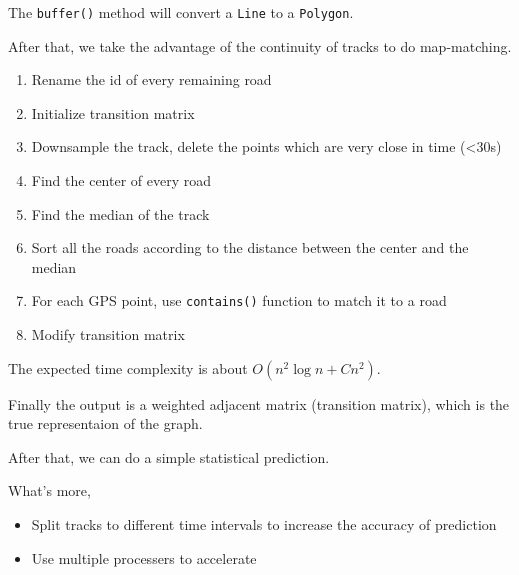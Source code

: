 \documentclass[fontset=none]{ctexart}
\theoremstyle{definition}
\theoremstyle{remark}
\begin{document}
The \texttt{buffer()} method will convert a \texttt{Line} to a \texttt{Polygon}.

After that, we take the advantage of the continuity of tracks to do map-matching.
\begin{enumerate}
  \item Rename the id of every remaining road
  \item Initialize transition matrix
  \item Downsample the track, delete the points which are very close in time (<30s)
  \item Find the center of every road
  \item Find the median of the track
  \item Sort all the roads according to the distance between the center and the median
  \item For each GPS point, use \texttt{contains()} function to match it to a road
  \item Modify transition matrix
\end{enumerate}

The expected time complexity is about $O(n^2\log n+Cn^2)$.

Finally the output is a weighted adjacent matrix (transition matrix), which is the true representaion of the graph.

After that, we can do a simple statistical prediction.

What's more,
\begin{itemize}
  \item Split tracks to different time intervals to increase the accuracy of prediction
  \item Use multiple processers to accelerate
\end{itemize}


% 
% 
\end{document}
